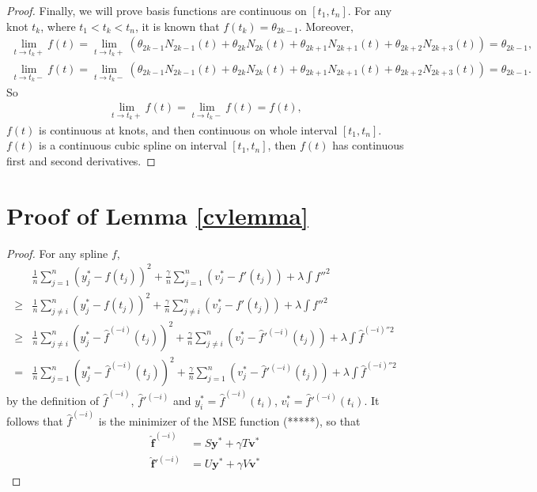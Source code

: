 \begin{proof}
Finally, we will prove basis functions are continuous on $[t_1, t_n]$. For any knot $t_k$, where $t_1< t_k <t_n$, it is known that $f(t_k)=\theta_{2k-1}$. Moreover, 
\begin{align*}
\lim\limits_{t\rightarrow t_k+} f(t) = \lim\limits_{t\rightarrow t_k+} (\theta_{2k-1}N_{2k-1}(t)+\theta_{2k}N_{2k}(t)+\theta_{2k+1}N_{2k+1}(t)+\theta_{2k+2}N_{2k+3}(t))=\theta_{2k-1},\\
\lim\limits_{t\rightarrow t_k-} f(t) = \lim\limits_{t\rightarrow t_k-} (\theta_{2k-1}N_{2k-1}(t)+\theta_{2k}N_{2k}(t)+\theta_{2k+1}N_{2k+1}(t)+\theta_{2k+2}N_{2k+3}(t))=\theta_{2k-1}.
\end{align*}
So
\begin{align*}
\lim\limits_{t\rightarrow t_k+} f(t) =\lim\limits_{t\rightarrow t_k-} f(t) =f(t),
\end{align*}
$f(t)$ is continuous at knots, and then continuous on whole interval $[t_1,t_n]$.
$f(t)$ is a continuous cubic spline on interval $[t_1,t_n]$, then $f(t)$ has continuous first and second derivatives.
\end{proof}

\section{Proof of Lemma \ref{cvlemma}}
\begin{proof}
For any spline $f$, 
\begin{equation}
\begin{split}
&\frac{1}{n}\sum_{j=1}^{n}(y_j^*-f(t_j))^2+\frac{\gamma}{n} \sum_{j=1}^{n}(v_j^*-f'(t_j))+\lambda\int f''^2 \\
\geq&\frac{1}{n}\sum_{j\neq i}^{n}(y_j^*-f(t_j))^2+\frac{\gamma}{n} \sum_{j\neq i}^{n}(v_j^*-f'(t_j))+\lambda\int f''^2\\
\geq&\frac{1}{n}\sum_{j\neq i}^{n}(y_j^*-\hat{f}^{(-i)}(t_j))^2+\frac{\gamma}{n} \sum_{j\neq i}^{n}(v_j^*-\hat{f}'^{(-i)}(t_j))+\lambda\int \hat{f}^{(-i)''2}\\
=&\frac{1}{n}\sum_{j=1}^{n}(y_j^*-\hat{f}^{(-i)}(t_j))^2+\frac{\gamma}{n} \sum_{j=1}^{n}(v_j^*-\hat{f}'^{(-i)}(t_j))+\lambda\int \hat{f}^{(-i)''2}
\end{split}
\end{equation}
by the definition of $\hat{f}^{(-i)}$, $\hat{f}'^{(-i)}$ and $y_i^*=\hat{f}^{(-i)}(t_i)$, $v_i^*=\hat{f}'^{(-i)}(t_i)$. It follows that $\hat{f}^{(-i)}$ is the minimizer of the MSE function (*****), so that
\begin{align}
\mathbf{\hat{f}}^{(-i)}&=S\mathbf{y}^*+\gamma T\mathbf{v}^*\\
\mathbf{\hat{f}}'^{(-i)}&=U\mathbf{y}^*+\gamma V\mathbf{v}^*
\end{align}
\end{proof}


